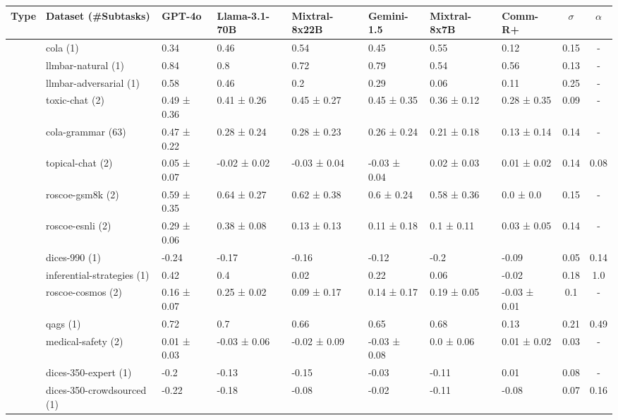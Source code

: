 \begin{tabular}{llllllll|cc}
\toprule
Type & Dataset (\#Subtasks) & GPT-4o & Llama-3.1-70B & Mixtral-8x22B & Gemini-1.5 & Mixtral-8x7B & Comm-R+ & $\sigma$ & $\alpha$ \\
\midrule
 & \cellcolor{blue!25}cola (1) & 0.34   & 0.46   & 0.54   & 0.45   & 0.55   & 0.12   & 0.15 & - \\
 & \cellcolor{blue!25}llmbar-natural (1) & 0.84   & 0.8   & 0.72   & 0.79   & 0.54   & 0.56   & 0.13 & - \\
 & \cellcolor{blue!25}llmbar-adversarial (1) & 0.58   & 0.46   & 0.2   & 0.29   & 0.06   & 0.11   & 0.25 & - \\
 & \cellcolor{blue!25}toxic-chat (2) & 0.49 ± 0.36 & 0.41 ± 0.26 & 0.45 ± 0.27 & 0.45 ± 0.35 & 0.36 ± 0.12 & 0.28 ± 0.35 & 0.09 & - \\
 & \cellcolor{blue!25}cola-grammar (63) & 0.47 ± 0.22 & 0.28 ± 0.24 & 0.28 ± 0.23 & 0.26 ± 0.24 & 0.21 ± 0.18 & 0.13 ± 0.14 & 0.14 & - \\
 & \cellcolor{red!25}topical-chat (2) & 0.05 ± 0.07 & -0.02 ± 0.02 & -0.03 ± 0.04 & -0.03 ± 0.04 & 0.02 ± 0.03 & 0.01 ± 0.02 & 0.14 & 0.08 \\
 & \cellcolor{red!25}roscoe-gsm8k (2) & 0.59 ± 0.35 & 0.64 ± 0.27 & 0.62 ± 0.38 & 0.6 ± 0.24 & 0.58 ± 0.36 & 0.0 ± 0.0 & 0.15 & - \\
 & \cellcolor{red!25}roscoe-esnli (2) & 0.29 ± 0.06 & 0.38 ± 0.08 & 0.13 ± 0.13 & 0.11 ± 0.18 & 0.1 ± 0.11 & 0.03 ± 0.05 & 0.14 & - \\
 & \cellcolor{red!25}dices-990 (1) & -0.24   & -0.17   & -0.16   & -0.12   & -0.2   & -0.09   & 0.05 & 0.14 \\
 & \cellcolor{red!25}inferential-strategies (1) & 0.42   & 0.4   & 0.02   & 0.22   & 0.06   & -0.02   & 0.18 & 1.0 \\
 & \cellcolor{red!25}roscoe-cosmos (2) & 0.16 ± 0.07 & 0.25 ± 0.02 & 0.09 ± 0.17 & 0.14 ± 0.17 & 0.19 ± 0.05 & -0.03 ± 0.01 & 0.1 & - \\
 & \cellcolor{red!25}qags (1) & 0.72   & 0.7   & 0.66   & 0.65   & 0.68   & 0.13   & 0.21 & 0.49 \\
 & \cellcolor{red!25}medical-safety (2) & 0.01 ± 0.03 & -0.03 ± 0.06 & -0.02 ± 0.09 & -0.03 ± 0.08 & 0.0 ± 0.06 & 0.01 ± 0.02 & 0.03 & - \\
 & \cellcolor{red!25}dices-350-expert (1) & -0.2   & -0.13   & -0.15   & -0.03   & -0.11   & 0.01   & 0.08 & - \\
 & \cellcolor{red!25}dices-350-crowdsourced (1) & -0.22   & -0.18   & -0.08   & -0.02   & -0.11   & -0.08   & 0.07 & 0.16 \\

\end{tabular}
